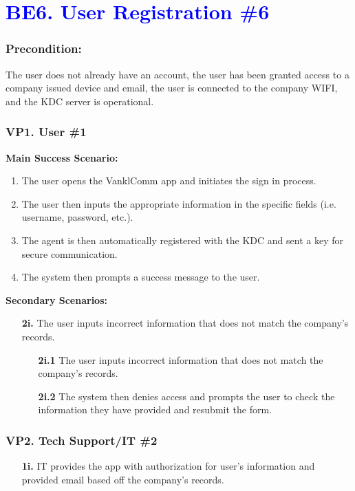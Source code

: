 \documentclass[]{article}
\begin{document}
\section*{\textcolor{blue}{BE6. User Registration \#6}}
\subsubsection*{Precondition:} The user does not already have an account, the user has been granted access to a company issued device and email, the user is connected to the company WIFI, and the KDC server is operational.
\subsubsection*{VP1. User \#1}
\textbf{Main Success Scenario:}
\begin{enumerate}
	\item The user opens the VanklComm app and initiates the sign in process.
	\item The user then inputs the appropriate information in the specific fields (i.e. username, password, etc.).
	\item The agent is then automatically registered with the KDC and sent a key for secure communication.
	\item The system then prompts a success message to the user.
\end{enumerate}
\textbf{Secondary Scenarios:}
\begin{enumerate}
	\item[\textbf{2i.}] The user inputs incorrect information that does not match the company’s records.
		\begin{enumerate}
			\item[\textbf{2i.1}] The user inputs incorrect information that does not match the company’s records.
			\item[\textbf{2i.2}] The system then denies access and prompts the user to check the information they have provided and resubmit the form.
		\end{enumerate}
\end{enumerate}
\subsubsection*{VP2. Tech Support/IT \#2}
\begin{enumerate}
	\item[\textbf{1i.}] IT provides the app with authorization for user's information and provided email based off the company's records.
\end{enumerate}
\end{document}
